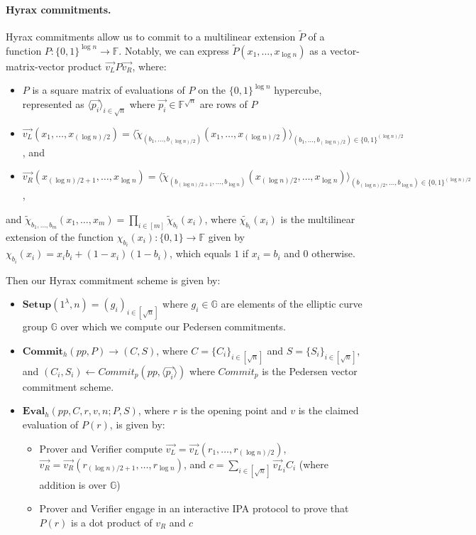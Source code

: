 \paragraph{Hyrax commitments.}
Hyrax commitments \cite{SP:WTSTW18} allow us to commit to a multilinear extension $\widetilde{P}$ of a function $P:\{0,1\}^{\log n} \rightarrow \mathbb{F}$. 
Notably, we can express $\widetilde{P}(x_1, \dots, x_{\log n})$ as a vector-matrix-vector product $\vec{v_L} P \vec{v_R}$, where:
\begin{itemize}
    \item $P$ is a square matrix of evaluations of $P$ on the $\{0,1\}^{\log n}$ hypercube, represented as $\langle \vec{p_i}\rangle_{i \in \sqrt{n}}$ where $\vec{p_i} \in \mathbb{F}^{\sqrt{n}}$ are rows of $P$
    \item $\vec{v_L}(x_1, \dots, x_{(\log n)/2}) = \langle \widetilde{\chi}_{(b_1, \dots, b_{(\log n)/2})}(x_1, \dots, x_{(\log n)/2})\rangle _{(b_1, \dots, b_{(\log n)/2})\in \{0,1\}^{(\log n)/2}}$, and 
    \item $\vec{v_R}(x_{(\log n)/2+1}, \dots, x_{\log n}) = \langle \widetilde{\chi}_{(b_{(\log n)/2+1}, \dots, b_{\log n})}(x_{(\log n)/2}, \dots, x_{\log n})\rangle_{(b_{(\log n)/2}, \dots, b_{\log n}) \in \{0,1\}^{(\log n)/2}}$,
\end{itemize}
and $\widetilde{\chi}_{b_1, \dots, b_m} (x_1, \dots, x_m) = \prod_{i \in [m]} \widetilde{\chi}_{b_i}(x_i)$, where
$\widetilde{\chi_{b_i}}(x_i)$ is the multilinear extension of the function $\chi_{b_i}(x_i): \{0,1\} \rightarrow \mathbb{F}$ given by $\chi_{b_i}(x_i) = x_ib_i + (1-x_i)(1-b_i)$, which equals $1$ if $x_i = b_i$ and $0$ otherwise.

Then our Hyrax commitment scheme is given by:
\begin{itemize}
    \item $\textbf{Setup}(1^{\lambda}, n) = (g_i)_{i \in [\sqrt n]}$ where $g_i \in \mathbb{G}$ are elements of the elliptic curve group $\mathbb{G}$ over which we compute our Pedersen commitments.
    \item $\textbf{Commit}_h(pp, P) \rightarrow (C,S)$, where 
    $C = \{C_i\}_{i \in [\sqrt{n}]}$ and $S = \{S_i\}_{i \in [\sqrt{n}]}$, and
    $(C_i, S_i) \leftarrow Commit_p(pp, \langle \vec{p_i} \rangle)$
    where $Commit_p$ is the Pedersen vector commitment scheme.
    \item $\textbf{Eval}_h(pp, C, r, v, n; P, S)$, where $r$ is the opening point and $v$ is the claimed evaluation of $P(r)$, is given by:
    \begin{itemize}
        \item Prover and Verifier compute $\vec{v_L} = \vec{v_L}(r_1, \dots, r_{(\log n)/2})$, $\vec{v_R} = \vec{v_R}(r_{(\log n)/2+1}, \dots, r_{\log n})$, 
    and $c = \sum_{i \in [\sqrt{n}]} \vec{v_L}_i C_i$ (where addition is over $\mathbb{G}$)
        \item Prover and Verifier engage in an interactive IPA protocol to prove that $P(r)$ is a dot product of $v_R$ and $c$ 
    \end{itemize} 
\end{itemize} 

